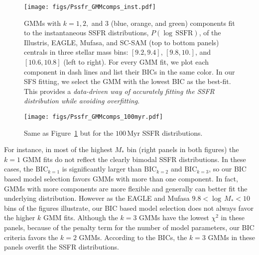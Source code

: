 \documentclass[tighten, preprint]{aastex62}
\begin{document}
{%
\begin{figure*}
\begin{center}
\texttt{[image: figs/Pssfr\_GMMcomps\_inst.pdf]} 
\caption{GMMs with $k=1, 2,$ and $3$ (blue, orange, and green) components fit
to the instantaneous SSFR distributions, $P(\log\,\mathrm{SSFR})$, of the 
Illustris, EAGLE, {\sc Mufasa}, and SC-SAM (top to bottom panels) centrals 
in three stellar mass bins: $[9.2, 9.4]$, $[9.8, 10.]$, and $[10.6, 10.8]$ 
(left to right). For every GMM fit, we plot each component in dash lines 
and list their BICs in the same color. In our SFS fitting, we select the 
GMM with the lowest BIC as the best-fit. This provides a \emph{data-driven 
way of accurately fitting the SSFR distribution while avoiding overfitting}.
} 
\label{fig:pssfr_gmm_inst}
\end{center}
\end{figure*}
\begin{figure*}
\begin{center}
\texttt{[image: figs/Pssfr\_GMMcomps\_100myr.pdf]} 
\caption{Same as Figure~\ref{fig:pssfr_gmm_inst} but for the $100\,\mathrm{Myr}$
SSFR distributions.} 
\label{fig:pssfr_gmm_100myr}
\end{center}
\end{figure*}
For instance, in most of the highest $M_*$ bin (right panels in both figures) 
the $k=1$ GMM fits do not reflect the clearly bimodal SSFR distributions.
In these cases, the $\mathrm{BIC}_{k=1}$ is significantly larger than
$\mathrm{BIC}_{k=2}$ and $\mathrm{BIC}_{k=3}$, so our BIC based model 
selection favors GMMs with more than one component. In fact, GMMs with
more components are more flexible and generally can better fit the underlying 
distribution. However as the EAGLE and {\sc Mufasa} $9.8 <\log\,M_*<10$ 
bins of the figures illustrate, our BIC based model selection does not 
always favor the higher $k$ GMM fits. Although the $k=3$ GMMs have the 
lowest $\chi^2$ in these panels, because of the penalty term for the 
number of model parameters, our BIC criteria favors the $k=2$ GMMs.
According to the BICs, the $k=3$ GMMs in these panels overfit the 
SSFR distributions.

}
\end{document}
